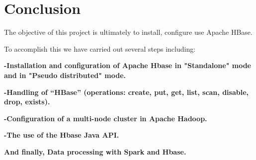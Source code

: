 \chapter*{Conclusion}
\vspace{2cm}
\par \Large The objective of this project is ultimately to install, configure use Apache HBase. \\
\par \Large To accomplish this we have carried out several steps including: 
\begin{flushleft} \large
{
\item \textbf{-Installation and configuration of Apache Hbase in "Standalone" mode and in "Pseudo distributed" mode.} \\[0.7cm]
\item \textbf{-Handling of “HBase” (operations: create, put, get, list, scan, disable, drop, exists).}\\[0.7cm]
\item \textbf{-Configuration of a multi-node cluster in Apache Hadoop.}\\[0.7cm]
\item \textbf{-The use of the Hbase Java API.}\\[0.7cm]
\item \textbf{And finally, Data processing with Spark and Hbase.}\\[0.7cm]
\item
}
\end{flushleft}


\newpage